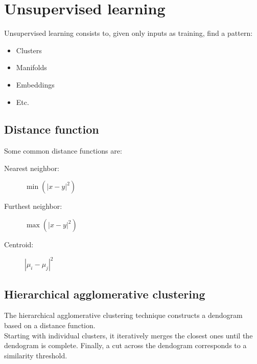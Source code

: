 \documentclass[11pt]{article}
\begin{document}
\section{Unsupervised learning}
\label{sec:org24b1b7e}
Unsupervised learning consists to, given only inputs as training, find a pattern:
\begin{itemize}[itemsep=0pt]
\item Clusters
\item Manifolds
\item Embeddings
\item Etc.
\end{itemize}
\subsection{Distance function}
\label{sec:org953bc3f}
Some common distance functions are:
\begin{description}
\item[{Nearest neighbor:}] \(\min({|x - y|}^2)\)
\item[{Furthest neighbor:}] \(\max({|x - y|}^2)\)
\item[{Centroid:}] \({|\mu_i - \mu_j|}^2\)
\end{description}
\subsection{Hierarchical agglomerative clustering}
\label{sec:org44a8e99}
The hierarchical agglomerative clustering technique constructs a dendogram based on a
distance function. \\
Starting with individual clusters, it iteratively merges the closest ones until the
dendogram is complete. Finally, a cut across the dendogram corresponds to a similarity
threshold.
\end{document}
